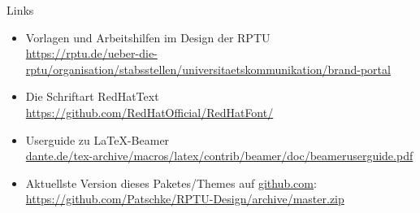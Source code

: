 \documentclass[german,10pt,xcolor=colortbl,compress
]{beamer}
\begin{document}
\begin{frame}{Links}
	\begin{itemize}
		\item Vorlagen und Arbeitshilfen im Design der RPTU\\ \href{https://rptu.de/ueber-die-rptu/organisation/stabsstellen/universitaetskommunikation/brand-portal}{https://rptu.de/ueber-die-rptu/organisation/stabsstellen/universitaetskommunikation/brand-portal}
		\item Die Schriftart RedHatText\\
		      \href{https://github.com/RedHatOfficial/RedHatFont/}{https://github.com/RedHatOfficial/RedHatFont/}
		\item Userguide zu \LaTeX-Beamer\\ \href{ftp://ftp.dante.de/tex-archive/macros/latex/contrib/beamer/doc/beameruserguide.pdf}{dante.de/tex-archive/macros/latex/contrib/beamer/doc/beameruserguide.pdf}
		\item Aktuellste Version dieses Paketes/Themes auf \href{http://github.com}{github.com}:\\
		      \href{https://github.com/Patschke/RPTU-Design/archive/master.zip}{https://github.com/Patschke/RPTU-Design/archive/master.zip}
	\end{itemize}
\end{frame}
\end{document}
